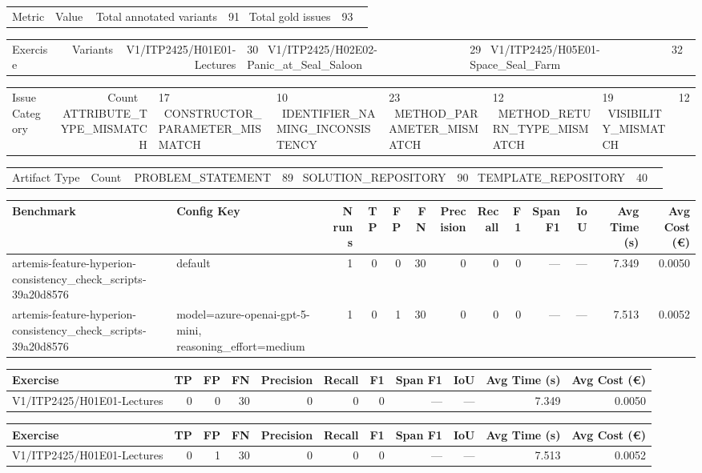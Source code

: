 \begin{tabular}{lr}
Metric & Value \
\hline
Total annotated variants & 91 \
Total gold issues & 93 \
\end{tabular}

\begin{tabular}{lr}
Exercise & Variants \
\hline
V1/ITP2425/H01E01-Lectures & 30 \
V1/ITP2425/H02E02-Panic\_at\_Seal\_Saloon & 29 \
V1/ITP2425/H05E01-Space\_Seal\_Farm & 32 \
\end{tabular}

\begin{tabular}{lr}
Issue Category & Count \
\hline
ATTRIBUTE\_TYPE\_MISMATCH & 17 \
CONSTRUCTOR\_PARAMETER\_MISMATCH & 10 \
IDENTIFIER\_NAMING\_INCONSISTENCY & 23 \
METHOD\_PARAMETER\_MISMATCH & 12 \
METHOD\_RETURN\_TYPE\_MISMATCH & 19 \
VISIBILITY\_MISMATCH & 12 \
\end{tabular}

\begin{tabular}{lr}
Artifact Type & Count \
\hline
PROBLEM\_STATEMENT & 89 \
SOLUTION\_REPOSITORY & 90 \
TEMPLATE\_REPOSITORY & 40 \
\end{tabular}

\begin{tabular}{llrrrrrrrrrrr}
Benchmark & Config Key & N runs & TP & FP & FN & Precision & Recall & F1 & Span F1 & IoU & Avg Time (s) & Avg Cost (€) \\
\hline
artemis-feature-hyperion-consistency\_check\_scripts-39a20d8576 & default & 1 & 0 & 0 & 30 & 0 & 0 & 0 & — & — & 7.349 & 0.0050 \\
artemis-feature-hyperion-consistency\_check\_scripts-39a20d8576 & model=azure-openai-gpt-5-mini, reasoning\_effort=medium & 1 & 0 & 1 & 30 & 0 & 0 & 0 & — & — & 7.513 & 0.0052 \\
\end{tabular}

\begin{tabular}{lrrrrrrrrrr}
Exercise & TP & FP & FN & Precision & Recall & F1 & Span F1 & IoU & Avg Time (s) & Avg Cost (€) \\
\hline
V1/ITP2425/H01E01-Lectures & 0 & 0 & 30 & 0 & 0 & 0 & — & — & 7.349 & 0.0050 \\
\end{tabular}

\begin{tabular}{lrrrrrrrrrr}
Exercise & TP & FP & FN & Precision & Recall & F1 & Span F1 & IoU & Avg Time (s) & Avg Cost (€) \\
\hline
V1/ITP2425/H01E01-Lectures & 0 & 1 & 30 & 0 & 0 & 0 & — & — & 7.513 & 0.0052 \\
\end{tabular}
